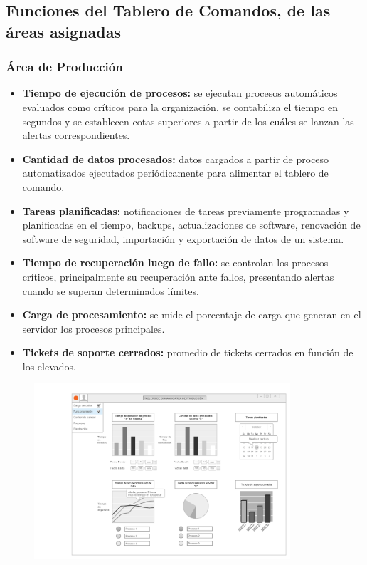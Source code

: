 \begin{itemize}
\begin{itemize}
                \end{itemize}
            \end{itemize}   

            
            
            
\newpage
    \subsection{Funciones del Tablero de Comandos, de las áreas asignadas} %
    
    \subsubsection{Área de Producción}
    	\begin{itemize}
			\item\textbf{Tiempo de ejecución de procesos:} se ejecutan procesos automáticos evaluados como críticos para la organización, se contabiliza el tiempo en segundos y se establecen cotas superiores a partir de los cuáles se lanzan las alertas correspondientes.
            \item\textbf{Cantidad de datos procesados:} datos cargados a partir de proceso automatizados ejecutados periódicamente para alimentar el tablero de comando.
            \item\textbf{Tareas planificadas:} notificaciones de tareas previamente programadas y planificadas en el tiempo, backups, actualizaciones de software, renovación de software de seguridad, importación y exportación de datos de un sistema.
            \item\textbf{Tiempo de recuperación luego de fallo:} se controlan los procesos críticos, principalmente su recuperación ante fallos, presentando alertas cuando se superan determinados límites.
            \item \textbf{Carga de procesamiento: }se mide el porcentaje de carga que generan en el servidor los procesos principales.
            \item \textbf{Tickets de soporte cerrados: }promedio de tickets cerrados en función de los elevados.
		\end{itemize}
        
	\begin{figure}[h]
	  \centering
  	  \includegraphics[width=0.85\textwidth]{img/tp2_integrador/area_produccion}
      \label{Área de producción}
	\end{figure}
    

